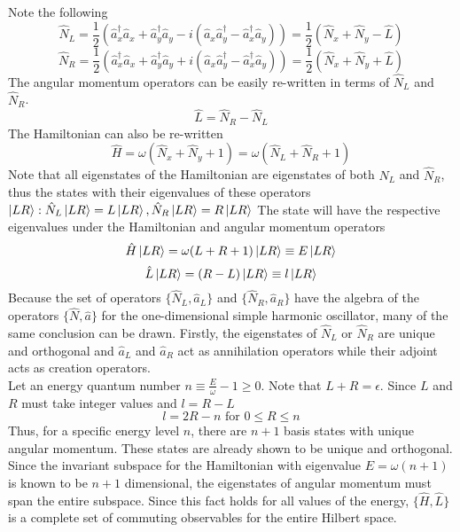 \begin{sol}
\begin{enumerate}[label=\textbf{(\alph*)}]
\begin{equation}
\end{equation}
Note the following
\begin{equation}
	\hat N_L=\frac{1}{2}\left(\hat a_x^\dagger\hat a_x+\hat a_y^\dagger\hat a_y-i(\hat a_x\hat a_y^\dagger-\hat a_x^\dagger\hat a_y)\right)=\frac{1}{2}(\hat N_x+\hat N_y-\hat L)
\end{equation}
\begin{equation}
	\hat N_R=\frac{1}{2}\left(\hat a_x^\dagger\hat a_x+\hat a_y^\dagger\hat a_y+i(\hat a_x\hat a_y^\dagger-\hat a_x^\dagger\hat a_y)\right)=\frac{1}{2}(\hat N_x+\hat N_y+\hat L)
\end{equation}
The angular momentum operators can be easily re-written in terms of $\hat N_L$ and $\hat N_R$.
\begin{equation}
	\hat L=\hat N_R-\hat N_L
\end{equation} 
The Hamiltonian can also be re-written
\begin{equation}
	\hat H=\omega(\hat N_x+\hat N_y+1)=\omega(\hat N_L+\hat N_R+1)
\end{equation} 
Note that all eigenstates of the Hamiltonian are eigenstates of both $\hat N_L$ and $\hat N_R$, thus the states with their eigenvalues of these operators $\ket{LR}:\hat N_L\ket{LR}=L\ket{LR},\hat N_R\ket{LR}=R\ket{LR}$ 
The state will have the respective eigenvalues under the Hamiltonian and angular momentum operators
\begin{equation}
	\hat H\ket{LR}=\omega(L+R+1)\ket{LR}\equiv E\ket{LR}
\end{equation}
\begin{equation}
	\hat L\ket{LR}=(R-L)\ket{LR}\equiv l\ket{LR}
\end{equation} 
Because the set of operators $\{\hat N_L,\hat a_L\}$ and $\{\hat N_R,\hat a_R\}$ have the algebra of the operators $\{\hat N,\hat a\}$ for the one-dimensional simple harmonic oscillator, many of the same conclusion can be drawn. Firstly, the eigenstates of $\hat N_L$ or $\hat N_R$ are unique and orthogonal and $\hat a_L$ and $\hat a_R$ act as annihilation operators while their adjoint acts as creation operators.\\
Let an energy quantum number $n\equiv\frac{E}{\omega}-1\geq 0$. Note that $L+R=\epsilon$. Since $L$ and $R$ must take integer values and $l=R-L$
\begin{equation}
	l=2R-n\text{ for }0\leq R\leq n
\end{equation}  
Thus, for a specific energy level $n$, there are $n+1$ basis states with unique angular momentum. These states are already shown to be unique and orthogonal. Since the invariant subspace for the Hamiltonian with eigenvalue $E=\omega(n+1)$ is known to be $n+1$ dimensional, the eigenstates of angular momentum must span the entire subspace. Since this fact holds for all values of the energy, $\{\hat H,\hat L\}$ is a complete set of commuting observables for the entire Hilbert space.
\end{enumerate}
\end{sol}